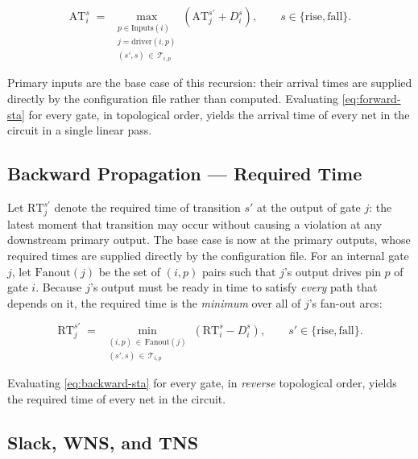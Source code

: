 \begin{equation}
    \mathrm{AT}_i^{s} \;=\; \max_{\substack{p \in \mathrm{Inputs}(i) \\ j = \mathrm{driver}(i,p) \\ (s',s)\,\in\,\mathcal{T}_{i,p}}} \left( \mathrm{AT}_j^{s'} + D_i^{s} \right), \qquad s \in \{\mathrm{rise},\mathrm{fall}\}.
    \label{eq:forward-sta}
\end{equation}

Primary inputs are the base case of this recursion: their arrival times are
supplied directly by the configuration file rather than computed. Evaluating
\cref{eq:forward-sta} for every gate, in topological order, yields the
arrival time of every net in the circuit in a single linear pass.

\subsection{Backward Propagation --- Required Time}
\label{sec:bg-sta-backward}

Let $\mathrm{RT}_j^{s'}$ denote the required time of transition $s'$ at the
output of gate $j$: the latest moment that transition may occur without
causing a violation at any downstream primary output. The base case is now
at the primary outputs, whose required times are supplied directly by the
configuration file. For an internal gate $j$, let $\mathrm{Fanout}(j)$ be
the set of $(i,p)$ pairs such that $j$'s output drives pin $p$ of gate $i$.
Because $j$'s output must be ready in time to satisfy \emph{every} path that
depends on it, the required time is the \emph{minimum} over all of $j$'s
fan-out arcs:

\begin{equation}
    \mathrm{RT}_j^{s'} \;=\; \min_{\substack{(i,p)\,\in\,\mathrm{Fanout}(j) \\ (s',s)\,\in\,\mathcal{T}_{i,p}}} \left( \mathrm{RT}_i^{s} - D_i^{s} \right), \qquad s' \in \{\mathrm{rise},\mathrm{fall}\}.
    \label{eq:backward-sta}
\end{equation}

Evaluating \cref{eq:backward-sta} for every gate, in \emph{reverse}
topological order, yields the required time of every net in the circuit.

\subsection{Slack, WNS, and TNS}
\label{sec:bg-sta-slack}

